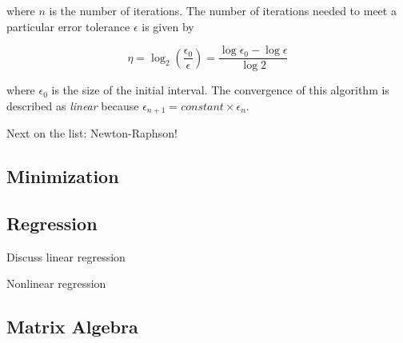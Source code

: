 where $n$ is the number of iterations. The number of iterations needed to meet a particular error tolerance $\epsilon$ is given by

\begin{equation}
\eta = \log_{2} (\frac{\epsilon_{0}}{\epsilon}) = \frac{\log \epsilon_{0} - \log \epsilon}{\log 2}
\end{equation}

where $\epsilon_{0}$ is the size of the initial interval. The convergence of this algorithm is described as \textit{linear} because $\epsilon_{n+1} = constant \times \epsilon_{n}$. 

Next on the list: Newton-Raphson!

\subsection{Minimization}

\subsection{Regression}

Discuss linear regression

Nonlinear regression


\subsection{Matrix Algebra}

